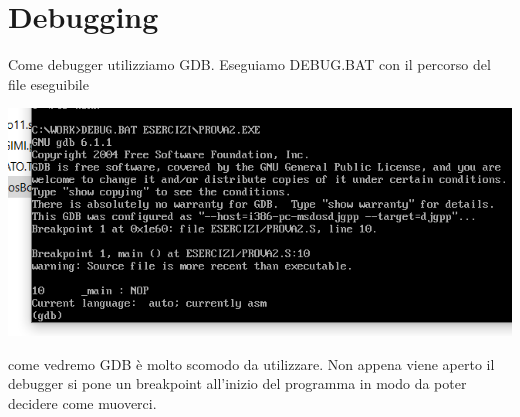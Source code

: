 \documentclass[11pt]{report}
\begin{document}
\section{Debugging}
Come debugger utilizziamo GDB. Eseguiamo DEBUG.BAT con il percorso del file eseguibile
\begin{center}
\includegraphics{img/68.PNG}
\end{center}
come vedremo GDB è molto scomodo da utilizzare. Non appena viene aperto il debugger si pone un breakpoint all'inizio del programma in modo da poter decidere come muoverci.
\end{document}
